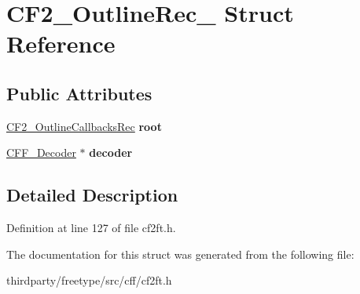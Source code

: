 \hypertarget{struct_c_f2___outline_rec__}{}\section{C\+F2\+\_\+\+Outline\+Rec\+\_\+ Struct Reference}
\label{struct_c_f2___outline_rec__}
\subsection*{Public Attributes}
\begin{DoxyCompactItemize}
\item 
\mbox{\label{struct_c_f2___outline_rec___a401b21819b5895c2caa529c1ffe3cc8e}} 
\hyperlink{struct_c_f2___outline_callbacks_rec__}{C\+F2\+\_\+\+Outline\+Callbacks\+Rec} {\bfseries root}
\item 
\mbox{\label{struct_c_f2___outline_rec___a90df19247357508a152479a31427e8d7}} 
\hyperlink{struct_c_f_f___decoder__}{C\+F\+F\+\_\+\+Decoder} $\ast$ {\bfseries decoder}
\end{DoxyCompactItemize}


\subsection{Detailed Description}


Definition at line 127 of file cf2ft.\+h.



The documentation for this struct was generated from the following file\+:\begin{DoxyCompactItemize}
\item 
thirdparty/freetype/src/cff/cf2ft.\+h\end{DoxyCompactItemize}
